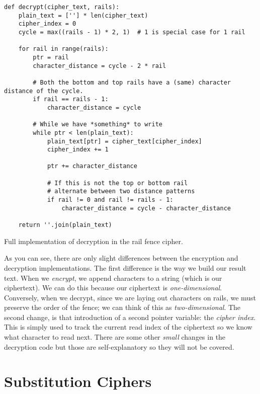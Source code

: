 \begin{listing}[H]
    \begin{verbatim}
def decrypt(cipher_text, rails):
    plain_text = [''] * len(cipher_text)
    cipher_index = 0
    cycle = max((rails - 1) * 2, 1)  # 1 is special case for 1 rail
    
    for rail in range(rails):
        ptr = rail
        character_distance = cycle - 2 * rail
    
        # Both the bottom and top rails have a (same) character distance of the cycle. 
        if rail == rails - 1:
            character_distance = cycle
    
        # While we have *something* to write
        while ptr < len(plain_text):
            plain_text[ptr] = cipher_text[cipher_index]
            cipher_index += 1
                
            ptr += character_distance
            
            # If this is not the top or bottom rail
            # alternate between two distance patterns  
            if rail != 0 and rail != rails - 1:
                character_distance = cycle - character_distance
    
    return ''.join(plain_text)
        \end{verbatim}
        \caption{Full implementation of decryption in the rail fence cipher.}
\end{listing}

As you can see, there are only slight differences between the encryption and decryption implementations. The first difference is the
way we build our result text. When we \textit{encrypt}, we append characters to a string (which is our ciphertext). We can do this because
our ciphertext is \textit{one-dimensional}. Conversely, when we decrypt, since we are laying out characters on rails, we must preserve the order of the
fence; we can think of this as \textit{two-dimensional}. The second change, is that introduction of a second pointer variable: the \textit{cipher index}. 
This is simply used to track the current read index of the ciphertext so we know what character to read next. There are some other \textit{small} changes in 
the decryption code but those are self-explanatory so they will not be covered.

\section{Substitution Ciphers}

